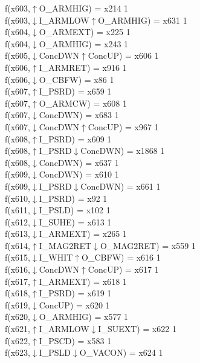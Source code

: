f(x603,$\uparrow$O\_ARMHIG) = x214 {1} \\
f(x603,$\downarrow$I\_ARMLOW$\uparrow$O\_ARMHIG) = x631 {1} \\
f(x604,$\downarrow$O\_ARMEXT) = x225 {1} \\
f(x604,$\downarrow$O\_ARMHIG) = x243 {1} \\
f(x605,$\downarrow$ConcDWN$\uparrow$ConcUP) = x606 {1} \\
f(x606,$\uparrow$I\_ARMRET) = x916 {1} \\
f(x606,$\downarrow$O\_CBFW) = x86 {1} \\
f(x607,$\uparrow$I\_PSRD) = x659 {1} \\
f(x607,$\uparrow$O\_ARMCW) = x608 {1} \\
f(x607,$\downarrow$ConcDWN) = x683 {1} \\
f(x607,$\downarrow$ConcDWN$\uparrow$ConcUP) = x967 {1} \\
f(x608,$\uparrow$I\_PSRD) = x609 {1} \\
f(x608,$\uparrow$I\_PSRD$\downarrow$ConcDWN) = x1868 {1} \\
f(x608,$\downarrow$ConcDWN) = x637 {1} \\
f(x609,$\downarrow$ConcDWN) = x610 {1} \\
f(x609,$\downarrow$I\_PSRD$\downarrow$ConcDWN) = x661 {1} \\
f(x610,$\downarrow$I\_PSRD) = x92 {1} \\
f(x611,$\downarrow$I\_PSLD) = x102 {1} \\
f(x612,$\downarrow$I\_SUHE) = x613 {1} \\
f(x613,$\downarrow$I\_ARMEXT) = x265 {1} \\
f(x614,$\uparrow$I\_MAG2RET$\downarrow$O\_MAG2RET) = x559 {1} \\
f(x615,$\downarrow$I\_WHIT$\uparrow$O\_CBFW) = x616 {1} \\
f(x616,$\downarrow$ConcDWN$\uparrow$ConcUP) = x617 {1} \\
f(x617,$\uparrow$I\_ARMEXT) = x618 {1} \\
f(x618,$\uparrow$I\_PSRD) = x619 {1} \\
f(x619,$\downarrow$ConcUP) = x620 {1} \\
f(x620,$\downarrow$O\_ARMHIG) = x577 {1} \\
f(x621,$\uparrow$I\_ARMLOW$\downarrow$I\_SUEXT) = x622 {1} \\
f(x622,$\uparrow$I\_PSCD) = x583 {1} \\
f(x623,$\downarrow$I\_PSLD$\downarrow$O\_VACON) = x624 {1} \\
